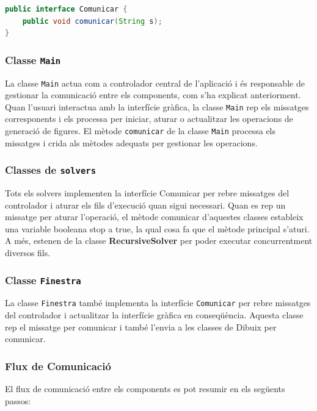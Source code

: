 \documentclass{ieeetj}
\begin{document}
\begin{lstlisting}[language=Java, basicstyle=\ttfamily\small]
public interface Comunicar {
    public void comunicar(String s);
}
\end{lstlisting}

\subsubsection{Classe \texttt{Main}}
La classe \texttt{Main} actua com a controlador central de l'aplicació i és responsable de gestionar la comunicació entre els components, com s'ha explicat anteriorment. Quan l'usuari interactua amb la interfície gràfica, la classe \texttt{Main} rep els missatges corresponents i els processa per iniciar, aturar o actualitzar les operacions de generació de figures. El mètode \texttt{comunicar} de la classe \texttt{Main} processa els missatges i crida als mètodes adequats per gestionar les operacions.

\subsubsection{Classes de \texttt{solvers}}
Tots els solvers implementen la interfície Comunicar per rebre missatges del controlador i aturar els fils d'execució quan sigui necessari. Quan es rep un missatge per aturar l’operació, el mètode comunicar d’aquestes classes estableix una variable booleana stop a true, la qual cosa fa que el mètode principal  s’aturi.
A més, estenen de la classe \textbf{RecursiveSolver} per poder executar concurrentment diversos fils.

\subsubsection{Classe \texttt{Finestra}}
La classe \texttt{Finestra} també implementa la interfície \texttt{Comunicar} per rebre missatges del controlador i actualitzar la interfície gràfica en conseqüència. Aquesta classe rep el missatge per comunicar i també l'envia a les classes de Dibuix per comunicar.
\subsubsection{Flux de Comunicació}
El flux de comunicació entre els components es pot resumir en els següents passos:
\end{document}
